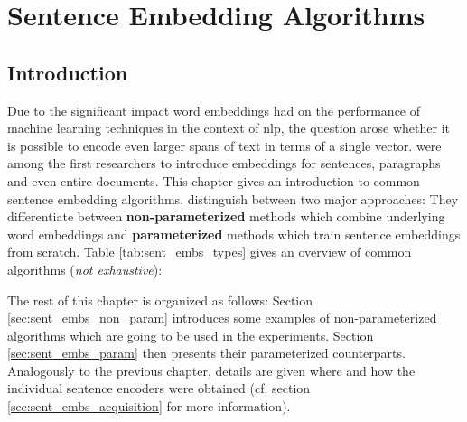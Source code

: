%
%

\section{Sentence Embedding Algorithms}
\label{sec:sent_embs}

\vspace*{-0.5mm}
\subsection{Introduction}
\label{sec:sent_embs_intro}

Due to the significant impact word embeddings had on the performance of machine learning techniques in the context of \gls{nlp}, the question arose whether it is possible to encode even larger spans of text in terms of a single vector. \citep{Le.2014} were among the first researchers to introduce embeddings for sentences, paragraphs and even entire documents. This chapter gives an introduction to common sentence embedding algorithms. \citep{Yang.2018} distinguish between two major approaches: They differentiate between \textbf{non-parameterized} methods which combine underlying word embeddings and \textbf{parameterized} methods which train sentence embeddings from scratch. Table \vref{tab:sent_embs_types} gives an overview of common algorithms (\textit{not exhaustive}):

\vspace*{3mm}

\vspace*{3mm}

The rest of this chapter is organized as follows: Section \vref{sec:sent_embs_non_param} introduces some examples of non-parameterized algorithms which are going to be used in the experiments. Section \vref{sec:sent_embs_param} then presents their parameterized counterparts. Analogously to the previous chapter, details are given where and how the individual sentence encoders were obtained (cf. section \vref{sec:sent_embs_acquisition} for more information).

